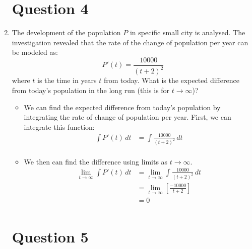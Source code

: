 \documentclass[12pt]{article}
\begin{document}
\begin{enumerate}[leftmargin=\labelsep]
    \newpage

    \section*{Question 4}

    \item The development of the population $P$ in specific small city is analysed. The investigation
    revealed that the rate of the change of population per year can be modeled as:
    \begingroup
    \large
    \begin{equation*}
        P'(t) = \frac{10000}{(t+2)^2}
    \end{equation*}
    \endgroup
    where $t$ is the time in years $t$ from today. What is the expected difference from today’s population
    in the long run (this is for $t \to \infty$)?
    \begin{itemize}[label={}]
        \item We can find the expected difference from today's population by integrating the rate of change of population per year. First, we can integrate this function:
        \begin{equation*}
            \begin{split}
                \int P'(t) \, dt &= \int \frac{10000}{(t+2)^2} \, dt \\
            \end{split}
        \end{equation*}
        \item We then can find the difference using limits as $t \to \infty$.
        \begin{equation*}
            \begin{split}
                \lim_{t \to \infty} \int P'(t) \, dt &= \lim_{t \to \infty} \int \frac{10000}{(t+2)^2} \, dt \\
                &= \lim_{t \to \infty} \left[ \frac{-10000}{t+2} \right] \\
                &= 0 \\
            \end{split}
        \end{equation*}
    \end{itemize}

    \newpage

    \section*{Question 5}


\end{enumerate}
\end{document}
